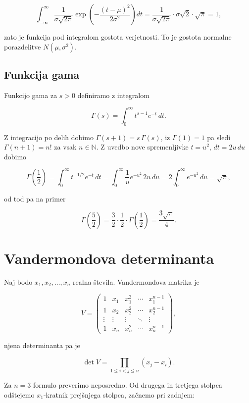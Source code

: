 \documentclass[
  slovene,
]{article}
\begin{document}
\[\int_{-\infty}^{\infty} \frac{1}{\sigma \sqrt{2\pi}} \exp\left( -\frac{(t - \mu)^2}{2\sigma^2} \right) dt = \frac{1}{\sigma \sqrt{2\pi}} \cdot \sigma \sqrt{2} \cdot \sqrt{\pi} = 1,\]

zato je funkcija pod integralom gostota verjetnosti. To je gostota
normalne porazdelitve \(N(\mu, \sigma^2)\).

\subsection{Funkcija gama}\label{funkcija-gama}

Funkcijo gama za \(s > 0\) definiramo z integralom

\[\Gamma(s) = \int_{0}^{\infty} t^{s - 1} e^{-t} \, dt.\]

Z integracijo po delih dobimo \(\Gamma(s + 1) = s \, \Gamma(s)\), iz
\(\Gamma(1) = 1\) pa sledi \(\Gamma(n + 1) = n!\) za vsak
\(n \in \mathbb{N}\). Z uvedbo nove spremenljivke \(t = u^2\),
\(dt = 2u \, du\) dobimo

\[\Gamma\left( \frac{1}{2} \right) = \int_{0}^{\infty} t^{-1/2} e^{-t} \, dt = \int_{0}^{\infty} \frac{1}{u} e^{-u^2} \, 2u \, du = 2 \int_{0}^{\infty} e^{-u^2} \, du = \sqrt{\pi},\]

od tod pa na primer

\[\Gamma\left( \frac{5}{2} \right) = \frac{3}{2} \cdot \frac{1}{2} \cdot \Gamma\left( \frac{1}{2} \right) = \frac{3\sqrt{\pi}}{4}.\]

\section{Vandermondova determinanta}\label{vandermondova-determinanta}

Naj bodo \(x_1, x_2, \ldots, x_n\) realna števila. Vandermondova matrika
je

\[V = \begin{pmatrix}
1 & x_1 & x_1^2 & \cdots & x_1^{n-1} \\
1 & x_2 & x_2^2 & \cdots & x_2^{n-1} \\
\vdots & \vdots & \vdots & \ddots & \vdots \\
1 & x_n & x_n^2 & \cdots & x_n^{n-1}
\end{pmatrix},\]

njena determinanta pa je

\[\det V = \prod_{1 \leq i < j \leq n} (x_j - x_i).\]

Za \(n = 3\) formulo preverimo neposredno. Od drugega in tretjega
stolpca odštejemo \(x_1\)-kratnik prejšnjega stolpca, začnemo pri
zadnjem:
\end{document}
